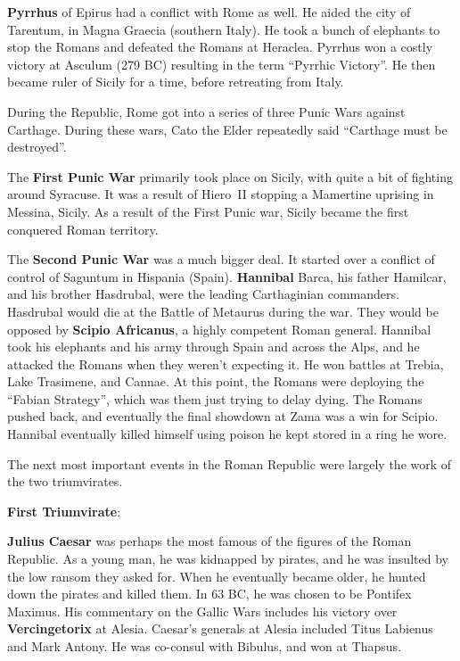 \textbf{Pyrrhus} of Epirus had a conflict with Rome as well.
He aided the city of Tarentum, in Magna Graecia (southern Italy).
He took a bunch of elephants to stop the Romans and defeated the Romans at Heraclea.
Pyrrhus won a costly victory at Asculum (279 BC) resulting in the term ``Pyrrhic Victory''.
He then became ruler of Sicily for a time, before retreating from Italy.

During the Republic, Rome got into a series of three Punic Wars against Carthage.
During these wars, Cato the Elder repeatedly said ``Carthage must be destroyed''.

The \textbf{First Punic War} primarily took place on Sicily, with quite a bit of fighting around Syracuse.
It was a result of Hiero~II stopping a Mamertine uprising in Messina, Sicily.
As a result of the First Punic war, Sicily became the first conquered Roman territory.

The \textbf{Second Punic War} was a much bigger deal.
It started over a conflict of control of Saguntum in Hispania (Spain).
\textbf{Hannibal} Barca, his father Hamilcar, and his brother Hasdrubal, were the leading Carthaginian commanders.
Hasdrubal would die at the Battle of Metaurus during the war.
They would be opposed by \textbf{Scipio Africanus}, a highly competent Roman general.
Hannibal took his elephants and his army through Spain and across the Alps,
and he attacked the Romans when they weren't expecting it.
He won battles at Trebia, Lake Trasimene, and Cannae.
At this point, the Romans were deploying the ``Fabian Strategy'', which was them just trying to delay dying.
The Romans pushed back, and eventually the final showdown at Zama was a win for Scipio.
Hannibal eventually killed himself using poison he kept stored in a ring he wore.



The next most important events in the Roman Republic were largely the work of the two triumvirates.

\textbf{First Triumvirate}:

\textbf{Julius Caesar} was perhaps the most famous of the figures of the Roman Republic.
As a young man, he was kidnapped by pirates, and he was insulted by the low ransom they asked for.
When he eventually became older, he hunted down the pirates and killed them.
In 63 BC, he was chosen to be Pontifex Maximus.
His commentary on the Gallic Wars includes his victory over \textbf{Vercingetorix} at Alesia.
Caesar's generals at Alesia included Titus Labienus and Mark Antony.
He was co-consul with Bibulus, and won at Thapsus.

